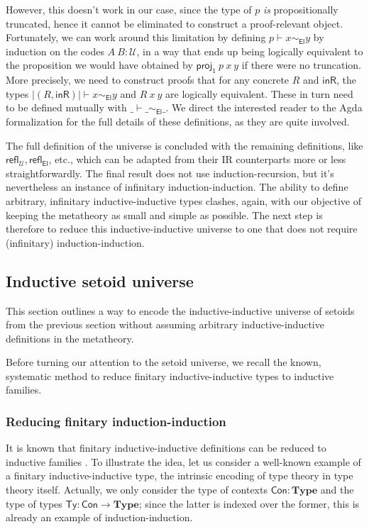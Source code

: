 \documentclass[a4paper,UKenglish,cleveref, autoref, thm-restate]{lipics-v2019}
\newcommand{\setoidU}{\mathcal{U}}
\newcommand{\mType}{\mathbf{Type}}
\newcommand{\El}{\textsf{El}}
\newcommand{\reflu}{\textsf{refl}_\setoidU}
\newcommand{\reflel}{\textsf{refl}_\El}
\begin{document}
However, this doesn't work in our case, since the type of $p$ \emph{is}
propositionally truncated, hence it cannot be eliminated to construct a
proof-relevant object.
%
Fortunately, we can work around this limitation by defining $p \vdash x
\sim_{\El} y$ by induction on the codes $A\ B : \setoidU$, in a way that ends
up being logically equivalent to the proposition we would have obtained by
$\mathsf{proj}_1\ p\ x\ y$ if there were no truncation.
%
More precisely, we need to construct proofs that for any concrete $R$ and
$\mathsf{inR}$, the types $| (R, \mathsf{inR}) | \vdash x \sim_{\El} y$ and $R\ x\ y$
are logically equivalent. These in turn need to be defined mutually with
$\_\vdash\_\sim_{\El}\_$. We direct the interested reader to the Agda
formalization for the full details of these definitions, as they are quite
involved.

The full definition of the universe is concluded with the remaining definitions,
like $\reflu, \reflel$, etc., which can be adapted from their IR counterparts
more or less straightforwardly. The final result does not use
induction-recursion, but it's nevertheless an instance of infinitary
induction-induction. The ability to define arbitrary, infinitary
inductive-inductive types clashes, again, with our objective of keeping the
metatheory as small and simple as possible. The next step is therefore to reduce
this inductive-inductive universe to one that does not require (infinitary)
induction-induction.

\subsection{Inductive setoid universe}

This section outlines a way to encode the inductive-inductive universe of
setoids from the previous section without assuming arbitrary inductive-inductive
definitions in the metatheory.

Before turning our attention to the setoid universe, we recall the known,
systematic method to reduce finitary inductive-inductive types to inductive
families.

\subsubsection{Reducing finitary induction-induction}

It is known that finitary inductive-inductive definitions can be reduced to
inductive families \cite{iit-erasure,iit-to-ix,induction-is-enough}.
%
To illustrate the idea, let us consider a well-known example of a finitary
inductive-inductive type, the intrinsic encoding of type theory in type theory
itself. Actually, we only consider the type of contexts $\textsf{Con} :
\mType$ and the type of types $\textsf{Ty} : \textsf{Con} \to \mType$; since the
latter is indexed over the former, this is already an example of
induction-induction.
\end{document}
